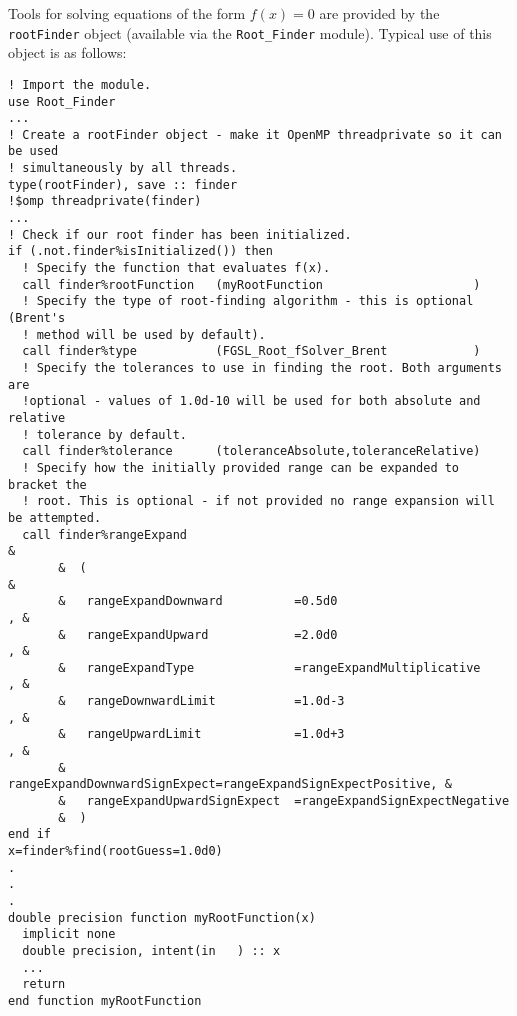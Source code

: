 Tools for solving equations of the form $f(x)=0$ are provided by the {\tt rootFinder} object (available via the {\tt Root\_Finder} module). Typical use of this object is as follows:
\begin{lstlisting}
! Import the module.
use Root_Finder
...
! Create a rootFinder object - make it OpenMP threadprivate so it can be used
! simultaneously by all threads.
type(rootFinder), save :: finder
!$omp threadprivate(finder)                                                                                                      
...
! Check if our root finder has been initialized.
if (.not.finder%isInitialized()) then
  ! Specify the function that evaluates f(x).
  call finder%rootFunction   (myRootFunction                     )
  ! Specify the type of root-finding algorithm - this is optional (Brent's
  ! method will be used by default).
  call finder%type           (FGSL_Root_fSolver_Brent            )
  ! Specify the tolerances to use in finding the root. Both arguments are
  !optional - values of 1.0d-10 will be used for both absolute and relative
  ! tolerance by default.
  call finder%tolerance      (toleranceAbsolute,toleranceRelative)
  ! Specify how the initially provided range can be expanded to bracket the
  ! root. This is optional - if not provided no range expansion will be attempted.
  call finder%rangeExpand                                               & 
       &  (                                                             &
       &   rangeExpandDownward          =0.5d0                        , &
       &   rangeExpandUpward            =2.0d0                        , &
       &   rangeExpandType              =rangeExpandMultiplicative    , &
       &   rangeDownwardLimit           =1.0d-3                       , &
       &   rangeUpwardLimit             =1.0d+3                       , &
       &   rangeExpandDownwardSignExpect=rangeExpandSignExpectPositive, &
       &   rangeExpandUpwardSignExpect  =rangeExpandSignExpectNegative
       &  )
end if
x=finder%find(rootGuess=1.0d0)
.
.
.
double precision function myRootFunction(x)
  implicit none
  double precision, intent(in   ) :: x
  ...
  return
end function myRootFunction
\end{lstlisting}
